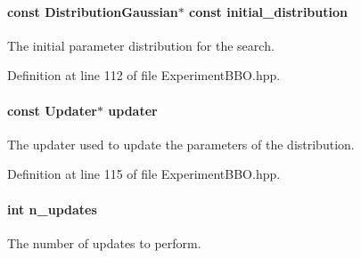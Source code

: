 \hypertarget{classDmpBbo_1_1ExperimentBBO_afae4d001a436497a4c8b74a066ac054a}{
\paragraph[{initial\+\_\+distribution}]{\setlength{\rightskip}{0pt plus 5cm}const {\bf Distribution\+Gaussian}$\ast$ const initial\+\_\+distribution}}\label{classDmpBbo_1_1ExperimentBBO_afae4d001a436497a4c8b74a066ac054a}


The initial parameter distribution for the search. 



Definition at line 112 of file Experiment\+B\+B\+O.\+hpp.

\hypertarget{classDmpBbo_1_1ExperimentBBO_aaab03971ba0e4eaf9466cc4e33290c96}{
\paragraph[{updater}]{\setlength{\rightskip}{0pt plus 5cm}const {\bf Updater}$\ast$ updater}}\label{classDmpBbo_1_1ExperimentBBO_aaab03971ba0e4eaf9466cc4e33290c96}


The updater used to update the parameters of the distribution. 



Definition at line 115 of file Experiment\+B\+B\+O.\+hpp.

\hypertarget{classDmpBbo_1_1ExperimentBBO_a96b1f7903bf380880b1482b32cb9efd3}{
\paragraph[{n\+\_\+updates}]{\setlength{\rightskip}{0pt plus 5cm}int n\+\_\+updates}}\label{classDmpBbo_1_1ExperimentBBO_a96b1f7903bf380880b1482b32cb9efd3}


The number of updates to perform. 



